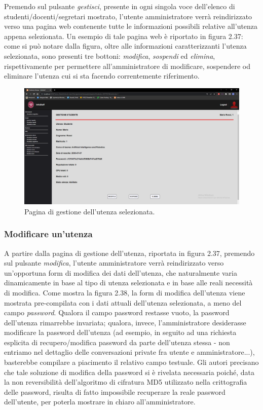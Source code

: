 \documentclass [a4paper,11pt]{book}
\begin{document}
Premendo sul pulsante \emph{gestisci}, presente in ogni singola voce dell'elenco di studenti/docenti/segretari mostrato, l'utente amministratore verrà reindirizzato verso una pagina web contenente tutte le informazioni possibili relative all'utenza appena selezionata. Un esempio di tale pagina web è riportato in figura 2.37: come si può notare dalla figura, oltre alle informazioni caratterizzanti l'utenza selezionata, sono presenti tre bottoni: \emph{modifica}, \emph{sospendi} ed \emph{elimina}, rispettivamente per permettere all'amministratore di modificare, sospendere od eliminare l'utenza cui si sta facendo correntemente riferimento.

\begin{figure}
\centering
\includegraphics[scale=0.3]{figura2-37.png}
\caption{Pagina di gestione dell'utenza selezionata.}
\end{figure}

\medskip

\subsubsection{Modificare un'utenza}

A partire dalla pagina di gestione dell'utenza, riportata in figura 2.37, premendo sul pulsante \emph{modifica}, l'utente amministratore verrà reindirizzato verso un'opportuna form di modifica dei dati dell'utenza, che naturalmente varia dinamicamente in base al tipo di utenza selezionata e in base alle reali necessità di modifica. Come mostra la figura 2.38, la form di modifica dell'utenza viene mostrata pre-compilata con i dati attuali dell'utenza selezionata, a meno del campo \emph{password}. Qualora il campo password restasse vuoto, la password dell'utenza rimarrebbe invariata; qualora, invece, l'amministratore desiderasse modificare la password dell'utenza (ad esempio, in seguito ad una richiesta esplicita di recupero/modifica password da parte dell'utenza stessa - non entriamo nel dettaglio delle conversazioni private fra utente e amministratore...), basterebbe compilare a piacimento il relativo campo testuale. Gli autori precisano che tale soluzione di modifica della password si è rivelata necessaria poiché, data la non reversibilità dell'algoritmo di cifratura MD5 utilizzato nella crittografia delle password, risulta di fatto impossibile recuperare la reale password dell'utente, per poterla mostrare in chiaro all'amministratore.
\end{document}
